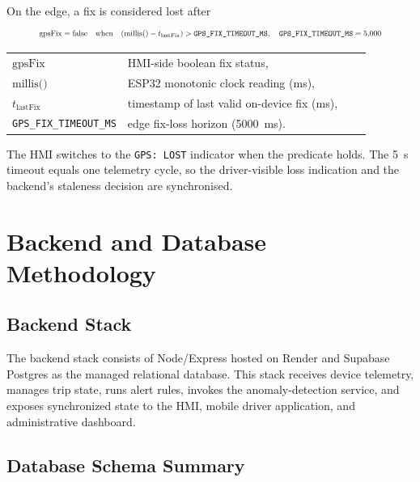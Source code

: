 On the edge, a fix is considered lost after
\begin{equation}
\resizebox{0.88\linewidth}{!}{$\displaystyle
\text{gpsFix} = \text{false} \quad \text{when} \quad (\text{millis()} - t_{\mathrm{lastFix}}) > \texttt{GPS\_FIX\_TIMEOUT\_MS}, \quad \texttt{GPS\_FIX\_TIMEOUT\_MS} = 5{,}000
$}
\label{eq:gps_fix_timeout}
\end{equation}
\noindent\begin{tabular}{@{}p{0.20\linewidth}@{\quad}p{0.68\linewidth}@{}}
$\text{gpsFix}$ & HMI-side boolean fix status, \\
$\text{millis()}$ & ESP32 monotonic clock reading (ms), \\
$t_{\mathrm{lastFix}}$ & timestamp of last valid on-device fix (ms), \\
\texttt{GPS\_FIX\_TIMEOUT\_MS} & edge fix-loss horizon (5000~ms).
\end{tabular}

\vspace{0.5em}
The HMI switches to the \texttt{GPS: LOST} indicator when the predicate holds. The 5~s timeout equals one telemetry cycle, so the driver-visible loss indication and the backend's staleness decision are synchronised.

\section{Backend and Database Methodology}
\label{sec:backend}

\subsection{Backend Stack}
The backend stack consists of Node/Express hosted on Render and Supabase Postgres as the managed relational database. This stack receives device telemetry, manages trip state, runs alert rules, invokes the anomaly-detection service, and exposes synchronized state to the HMI, mobile driver application, and administrative dashboard.

\subsection{Database Schema Summary}

